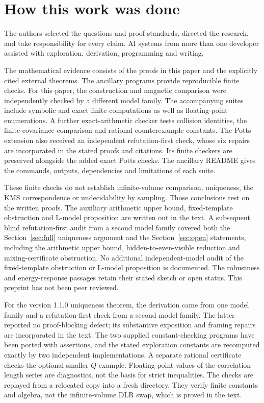 \section*{How this work was done}\label{sec:methods}

The authors selected the questions and proof standards, directed the research, and take responsibility for every claim. AI systems from more than one developer assisted with exploration, derivation, programming and writing.

The mathematical evidence consists of the proofs in this paper and the explicitly cited external theorems. The ancillary programs provide reproducible finite checks. For this paper, the construction and magnetic comparison were independently checked by a different model family. The accompanying suites include symbolic and exact finite computations as well as floating-point enumerations. A further exact-arithmetic checker tests collision identities, the finite covariance comparison and rational counterexample constants. The Potts extension also received an independent refutation-first check, whose six repairs are incorporated in the stated proofs and citations. Its finite checkers are preserved alongside the added exact Potts checks. The ancillary README gives the commands, outputs, dependencies and limitations of each suite.

These finite checks do not establish infinite-volume comparison, uniqueness, the KMS correspondence or undecidability by sampling. Those conclusions rest on the written proofs. The auxiliary arithmetic upper bound, fixed-template obstruction and L-model proposition are written out in the text. A subsequent blind refutation-first audit from a second model family covered both the Section~\ref{sec:full} uniqueness argument and the Section~\ref{sec:open} statements, including the arithmetic upper bound, hidden-to-even-visible reduction and mixing-certificate obstruction. No additional independent-model audit of the fixed-template obstruction or L-model proposition is documented. The robustness and energy-response passages retain their stated sketch or open status. This preprint has not been peer reviewed.


For the version 1.1.0 uniqueness theorem, the derivation came from one model family and a refutation-first check from a second model family. The latter reported no proof-blocking defect; its substantive exposition and framing repairs are incorporated in the text. The two supplied constant-checking programs have been ported with assertions, and the stated exploration constants are recomputed exactly by two independent implementations. A separate rational certificate checks the optional smaller-$Q$ example. Floating-point values of the correlation-length series are diagnostics, not the basis for strict inequalities. The checks are replayed from a relocated copy into a fresh directory. They verify finite constants and algebra, not the infinite-volume DLR swap, which is proved in the text.

